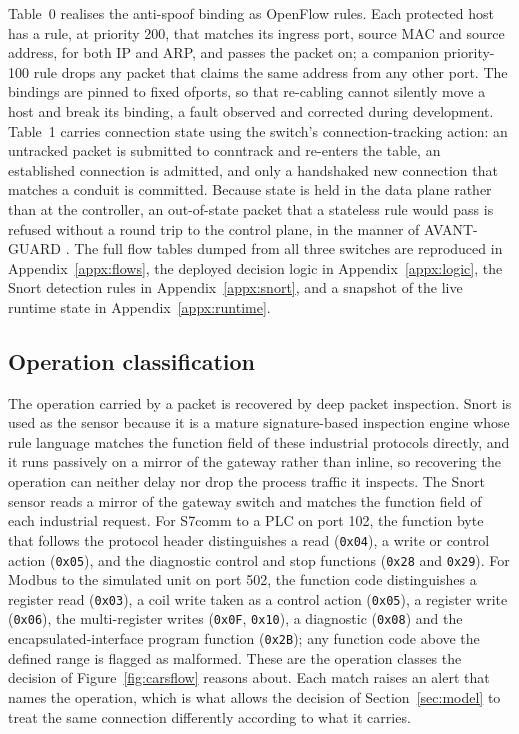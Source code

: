 Table~0 realises the anti-spoof binding as OpenFlow rules. Each protected host has a rule, at priority 200, that matches its ingress port, source MAC and source address, for both IP and ARP, and passes the packet on; a companion priority-100 rule drops any packet that claims the same address from any other port. The bindings are pinned to fixed ofports, so that re-cabling cannot silently move a host and break its binding, a fault observed and corrected during development. Table~1 carries connection state using the switch's connection-tracking action: an untracked packet is submitted to conntrack and re-enters the table, an established connection is admitted, and only a handshaked new connection that matches a conduit is committed. Because state is held in the data plane rather than at the controller, an out-of-state packet that a stateless rule would pass is refused without a round trip to the control plane, in the manner of AVANT-GUARD \cite{shin2013avantguard}. The full flow tables dumped from all three switches are reproduced in Appendix~\ref{appx:flows}, the deployed decision logic in Appendix~\ref{appx:logic}, the Snort detection rules in Appendix~\ref{appx:snort}, and a snapshot of the live runtime state in Appendix~\ref{appx:runtime}.

\subsection{Operation classification}

The operation carried by a packet is recovered by deep packet inspection. Snort is used as the sensor because it is a mature signature-based inspection engine whose rule language matches the function field of these industrial protocols directly, and it runs passively on a mirror of the gateway rather than inline, so recovering the operation can neither delay nor drop the process traffic it inspects. The Snort sensor reads a mirror of the gateway switch and matches the function field of each industrial request. For S7comm to a PLC on port 102, the function byte that follows the protocol header distinguishes a read (\texttt{0x04}), a write or control action (\texttt{0x05}), and the diagnostic control and stop functions (\texttt{0x28} and \texttt{0x29}). For Modbus to the simulated unit on port 502, the function code distinguishes a register read (\texttt{0x03}), a coil write taken as a control action (\texttt{0x05}), a register write (\texttt{0x06}), the multi-register writes (\texttt{0x0F}, \texttt{0x10}), a diagnostic (\texttt{0x08}) and the encapsulated-interface program function (\texttt{0x2B}); any function code above the defined range is flagged as malformed. These are the operation classes the decision of Figure~\ref{fig:carsflow} reasons about. Each match raises an alert that names the operation, which is what allows the decision of Section~\ref{sec:model} to treat the same connection differently according to what it carries.


